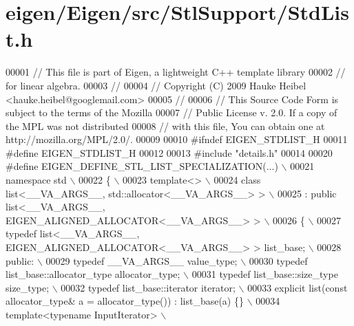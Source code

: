 \hypertarget{eigen_2_eigen_2src_2_stl_support_2_std_list_8h_source}{}\section{eigen/\+Eigen/src/\+Stl\+Support/\+Std\+List.h}
\label{eigen_2_eigen_2src_2_stl_support_2_std_list_8h_source}

\begin{DoxyCode}
00001 \textcolor{comment}{// This file is part of Eigen, a lightweight C++ template library}
00002 \textcolor{comment}{// for linear algebra.}
00003 \textcolor{comment}{//}
00004 \textcolor{comment}{// Copyright (C) 2009 Hauke Heibel <hauke.heibel@googlemail.com>}
00005 \textcolor{comment}{//}
00006 \textcolor{comment}{// This Source Code Form is subject to the terms of the Mozilla}
00007 \textcolor{comment}{// Public License v. 2.0. If a copy of the MPL was not distributed}
00008 \textcolor{comment}{// with this file, You can obtain one at http://mozilla.org/MPL/2.0/.}
00009 
00010 \textcolor{preprocessor}{#ifndef EIGEN\_STDLIST\_H}
00011 \textcolor{preprocessor}{#define EIGEN\_STDLIST\_H}
00012 
00013 \textcolor{preprocessor}{#include "details.h"}
00014 
00020 \textcolor{preprocessor}{#define EIGEN\_DEFINE\_STL\_LIST\_SPECIALIZATION(...) \(\backslash\)}
00021 \textcolor{preprocessor}{namespace std \(\backslash\)}
00022 \textcolor{preprocessor}{\{ \(\backslash\)}
00023 \textcolor{preprocessor}{  template<> \(\backslash\)}
00024 \textcolor{preprocessor}{  class list<\_\_VA\_ARGS\_\_, std::allocator<\_\_VA\_ARGS\_\_> >           \(\backslash\)}
00025 \textcolor{preprocessor}{    : public list<\_\_VA\_ARGS\_\_, EIGEN\_ALIGNED\_ALLOCATOR<\_\_VA\_ARGS\_\_> > \(\backslash\)}
00026 \textcolor{preprocessor}{  \{ \(\backslash\)}
00027 \textcolor{preprocessor}{    typedef list<\_\_VA\_ARGS\_\_, EIGEN\_ALIGNED\_ALLOCATOR<\_\_VA\_ARGS\_\_> > list\_base; \(\backslash\)}
00028 \textcolor{preprocessor}{  public: \(\backslash\)}
00029 \textcolor{preprocessor}{    typedef \_\_VA\_ARGS\_\_ value\_type; \(\backslash\)}
00030 \textcolor{preprocessor}{    typedef list\_base::allocator\_type allocator\_type; \(\backslash\)}
00031 \textcolor{preprocessor}{    typedef list\_base::size\_type size\_type;  \(\backslash\)}
00032 \textcolor{preprocessor}{    typedef list\_base::iterator iterator;  \(\backslash\)}
00033 \textcolor{preprocessor}{    explicit list(const allocator\_type& a = allocator\_type()) : list\_base(a) \{\}  \(\backslash\)}
00034 \textcolor{preprocessor}{    template<typename InputIterator> \(\backslash\)}

\end{DoxyCode}
